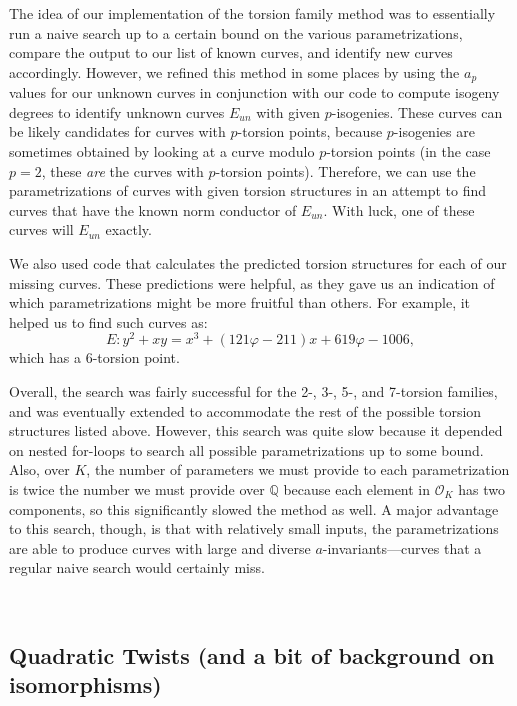 The idea of our implementation of the torsion family method was to essentially run a naive search up to a certain bound on the various parametrizations, compare the output to our list of known curves, and identify new curves accordingly.  However, we refined this method in some places by using the $a_p$ values for our unknown curves in conjunction with our code to compute isogeny degrees to identify unknown curves $E_{un}$ with given $p$-isogenies. These curves can be likely candidates for curves with $p$-torsion points, because $p$-isogenies are sometimes obtained by looking at a curve modulo $p$-torsion points (in the case $p=2$, these \emph{are} the curves with $p$-torsion points). Therefore, we can use the parametrizations of curves with given torsion structures in an attempt to find curves that have the known norm conductor of $E_{un}$. With luck, one of these curves will $E_{un}$ exactly.

We also used code that calculates the predicted torsion structures for each of our missing curves. These predictions were helpful, as they gave us an indication of which parametrizations might be more fruitful than others. For example, it helped us to find such curves as:
\begin{equation}
E:  y^2+xy=x^3+(121\varphi-211)x+619\varphi-1006, \nonumber
\end{equation}
which has a 6-torsion point.

Overall, the search was fairly successful for the 2-, 3-, 5-, and 7-torsion families, and was eventually extended to accommodate the rest of the possible torsion structures listed above. However, this search was quite slow because it depended on nested for-loops to search all possible parametrizations up to some bound. Also, over $K$, the number of parameters we must provide to each parametrization is twice the number we must provide over $\mathbb{Q}$ because each element in $\mathcal{O}_K$ has two components, so this significantly slowed the method as well. A major advantage to this search, though, is that with relatively small inputs, the parametrizations are able to produce curves with large and diverse $a$-invariants---curves that a regular naive search would certainly miss.

\

\subsection{Quadratic Twists (and a bit of background on isomorphisms)}

